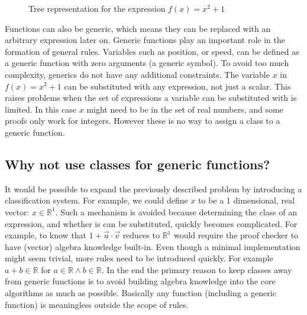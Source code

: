 \documentclass{article}
\begin{document}
\begin{figure}
\centering
{}
\caption{Tree representation for the expression $f(x)=x^2+1$} \label{fig:ast}
\end{figure}

Functions can also be generic, which means they can be replaced with an arbitrary expression later on. Generic functions play an important role in the formation of general rules. Variables such as position, or speed, can be defined as a generic function with zero arguments (a generic symbol). To avoid too much complexity, generics do not have any additional constraints. The variable $x$ in $f(x)=x^2+1$ can be substituted with any expression, not just a scalar. This raises problems when the set of expressions a variable can be substituted with is limited. In this case $x$ might need to be in the set of real numbers, and some proofs only work for integers. However these is no way to assign a class to a generic function.

\subsection{Why not use classes for generic functions?}
\label{section:why-no-classes}
It would be possible to expand the previously described problem by introducing a classification system. For example, we could define $x$ to be a 1 dimensional, real vector:  $x\in\mathbb{R}^1$. Such a mechanism is avoided because determining the class of an expression, and whether is can be substituted, quickly becomes complicated. For example, to know that $1+\vec{u}\cdot\vec{v}$ reduces to $\mathbb{R}^1$ would require the proof checker to have (vector) algebra knowledge built-in. Even though a minimal implementation might seem trivial, more rules need to be introduced quickly. For example $a+b\in\mathbb{R}$ for $a\in\mathbb{R}\land b\in\mathbb{R}$. In the end the primary reason to keep classes away from generic functions is to avoid building algebra knowledge into the core algorithms as much as  possible. Basically any function (including a generic function) is meaningless outside the scope of rules.
\end{document}
